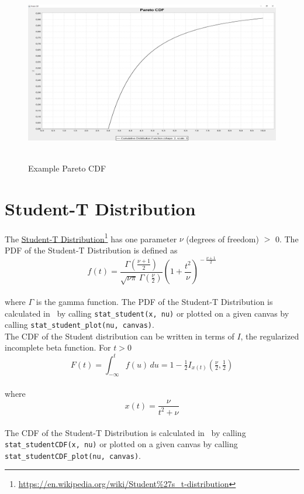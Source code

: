 		\begin{figure}[H]
			\centering
			\includegraphics[width=1\textwidth]{Figures/implemented_functions/pareto_cdf}~\\
			\caption{Example Pareto CDF}
			\label{fig:pareto_cdf}
		\end{figure}

		
	\section{Student-T Distribution}
	
		The \href{https://en.wikipedia.org/wiki/Student\%27s_t-distribution}{Student-T Distribution}\footnote{\url{https://en.wikipedia.org/wiki/Student\%27s_t-distribution}} has one parameter $\nu$ (degrees of freedom) $>$ 0. The \ac{PDF} of the Student-T Distribution is defined as
		\\[0.3cm]
		$$f(t) = \frac{\Gamma(\frac{\nu+1}{2})} {\sqrt{\nu\pi}\,\Gamma(\frac{\nu}{2})} \left(1+\frac{t^2}{\nu} \right)^{\!-\frac{\nu+1}{2}}$$
		\\[0.3cm]
		where $\Gamma$ is the gamma function. The \ac{PDF} of the Student-T Distribution is calculated in \setlx\ by calling \lstinline{stat_student(x, nu)} or plotted on a given canvas by calling \lstinline{stat_student_plot(nu, canvas)}.
		\\[0.3cm]
		The \ac{CDF} of the Student distribution can be written in terms of $I$, the regularized incomplete beta function. For $t > 0$
		\\[0.3cm]
		$$F(t) = \int_{-\infty}^t f(u)\,du = 1 - \tfrac{1}{2} I_{x(t)}\left(\tfrac{\nu}{2}, \tfrac{1}{2}\right)$$
		\\[0.3cm]
		where $$x(t) = \frac{\nu}{{t^2+\nu}}$$
		\\[0.3cm]
		The \ac{CDF} of the Student-T Distribution is calculated in \setlx\ by calling \lstinline{stat_studentCDF(x, nu)} or plotted on a given canvas by calling \lstinline{stat_studentCDF_plot(nu, canvas)}.

